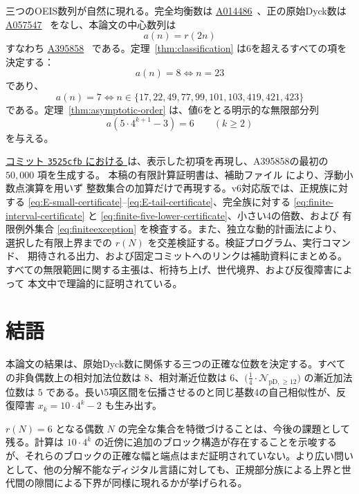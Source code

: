 \documentclass[12pt]{ltjsarticle}
\theoremstyle{plain}
\theoremstyle{definition}
\theoremstyle{plain}
\newcommand{\Pset}{%
  \bigl(\tfrac{1}{4}\cdot\mathcal{N}_{\mathrm{pD},\geq 12}\bigr)%
}
\newcommand{\seqnum}[1]{\href{https://oeis.org/#1}{\textrm{\underline{#1}}}}
\begin{document}
三つのOEIS数列が自然に現れる。完全均衡数は \seqnum{A014486}~\cite{OEIS-A014486}、正の原始Dyck数は \seqnum{A057547}~\cite{OEIS-A057547} をなし、本論文の中心数列は
\[
  a(n)=r(2n)
\]
すなわち \seqnum{A395858}~\cite{OEIS-A395858} である。定理~\ref{thm:classification} は6を超えるすべての項を決定する：
\[
  a(n)=8\iff n=23
\]
であり、
\[
  a(n)=7\iff
  n\in\{17,22,49,77,99,101,103,419,421,423\}
\]
である。定理~\ref{thm:asymptotic-order} は、値6をとる明示的な無限部分列
\begin{equation}\label{eq:A395858-six-subsequence}
  a(5\cdot4^{k+1}-3)=6\qquad(k\geq2)
\end{equation}
を与える。

\href{https://github.com/growupkuriyama-hub/lean_cfg_project/blob/3525cfb/LeanCfgProject/PrimDyck/A395858.py}{コミット \texttt{3525cfb} における }
は、表示した初項を再現し、A395858の最初の $50{,}000$ 項を生成する。
本稿の有限計算証明書は、補助ファイル
 により、浮動小数点演算を用いず
整数集合の加算だけで再現する。v6対応版では、正規族に対する
\eqref{eq:E-small-certificate}--\eqref{eq:E-tail-certificate}、完全族に対する
\eqref{eq:finite-interval-certificate} と
\eqref{eq:finite-five-lower-certificate}、小さい4の倍数、および
有限例外集合 \eqref{eq:finiteexception} を検査する。また、独立な動的計画法により、
選択した有限上界までの $r(N)$ を交差検証する。検証プログラム、実行コマンド、
期待される出力、および固定コミットへのリンクは補助資料にまとめる。
すべての無限範囲に関する主張は、桁持ち上げ、世代境界、および反復障害によって
本文中で理論的に証明されている。

\section{結語}

本論文の結果は、原始Dyck数に関係する三つの正確な位数を決定する。すべての非負偶数上の相対加法位数は $8$、相対漸近位数は $6$、$\Pset$ の漸近加法位数は $5$ である。長い5項区間を伝播させるのと同じ基数4の自己相似性が、反復障害 $x_k=10\cdot4^k-2$ も生み出す。

$r(N)=6$ となる偶数 $N$ の完全な集合を特徴づけることは、今後の課題として残る。計算は $10\cdot4^k$ の近傍に追加のブロック構造が存在することを示唆するが、それらのブロックの正確な幅と端点はまだ証明されていない。より広い問いとして、他の分解不能なディジタル言語に対しても、正規部分族による上界と世代間の隙間による下界が同様に現れるかが挙げられる。
\end{document}
